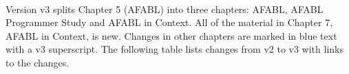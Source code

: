 \documentclass[twoside,openright,12pt]{report}   %
\begin{document}


\\

Version v3 splits Chapter 5 (AFABL) into three chapters: AFABL, AFABL Programmer Study and AFABL in Context.  All of the material in Chapter 7, AFABL in Context, is new. Changes in other chapters are marked in blue text with a v3 superscript. The following table lists changes from v2 to v3 with links to the changes.

\listofchanges[style=list]

\doublespacing  %














\setcounter{page}{5} %




\end{document}
